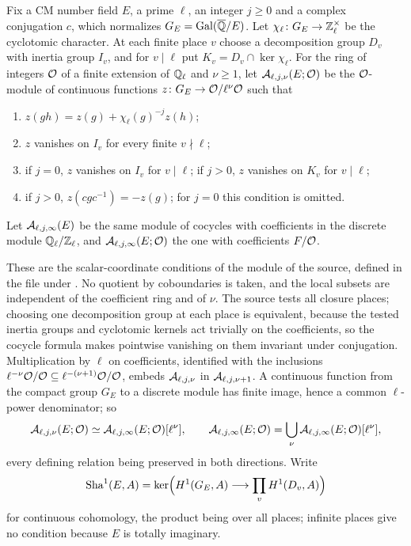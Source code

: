 \begin{definition}\label{sel:def:oddcocycles}
Fix a CM number field $E$, a prime $\ell$, an integer $j\ge0$ and a complex
conjugation $c$, which normalizes $G_E=\operatorname{Gal}(\overline{\mathbb{Q}}/E)$. Let
$\chi_\ell\colon G_E\to\mathbb{Z}_\ell^\times$ be the cyclotomic character. At each
finite place $v$ choose a decomposition group $D_v$ with inertia group
$I_v$, and for $v\mid\ell$ put $K_v=D_v\cap\ker\chi_\ell$. For the ring of
integers $\mathcal{O}$ of a finite extension of $\mathbb{Q}_\ell$ and $\nu\ge1$, let
$\mathcal{A}_{\ell,j,\nu}(E;\mathcal{O})$ be the $\mathcal{O}$-module of continuous functions
$z\colon G_E\to\mathcal{O}/\ell^\nu\mathcal{O}$ such that
\begin{enumerate}[label=\textup{(\arabic*)}]
\item $z(gh)=z(g)+\chi_\ell(g)^{-j}z(h)$;
\item $z$ vanishes on $I_v$ for every finite $v\nmid\ell$;
\item if $j=0$, $z$ vanishes on $I_v$ for $v\mid\ell$; if $j>0$, $z$
vanishes on $K_v$ for $v\mid\ell$;
\item if $j>0$, $z(cgc^{-1})=-z(g)$; for $j=0$ this condition is omitted.
\end{enumerate}
Let $\mathcal{A}_{\ell,j,\infty}(E)$ be the same module of cocycles with
coefficients in the discrete module $\mathbb{Q}_\ell/\mathbb{Z}_\ell$, and
$\mathcal{A}_{\ell,j,\infty}(E;\mathcal{O})$ the one with coefficients $F/\mathcal{O}$.
\end{definition}

These are the scalar-coordinate conditions of the module
 of the source, defined in the file
 under . No quotient by coboundaries is taken, and the local subsets are independent
of the coefficient ring and of $\nu$. The source tests all closure places;
choosing one decomposition group at each place is equivalent, because the
tested inertia groups and cyclotomic kernels act trivially on the
coefficients, so the cocycle formula makes pointwise vanishing on them
invariant under conjugation. Multiplication by $\ell$ on coefficients,
identified with the inclusions
$\ell^{-\nu}\mathcal{O}/\mathcal{O}\subseteq\ell^{-(\nu+1)}\mathcal{O}/\mathcal{O}$, embeds
$\mathcal{A}_{\ell,j,\nu}$ in $\mathcal{A}_{\ell,j,\nu+1}$. A continuous function from
the compact group $G_E$ to a discrete module has finite image, hence a
common $\ell$-power denominator; so
\begin{equation}\label{sel:eq:torsionlevels}
 \mathcal{A}_{\ell,j,\nu}(E;\mathcal{O})\simeq\mathcal{A}_{\ell,j,\infty}(E;\mathcal{O})[\ell^\nu],
 \qquad
 \mathcal{A}_{\ell,j,\infty}(E;\mathcal{O})=\bigcup_{\nu}\mathcal{A}_{\ell,j,\infty}(E;\mathcal{O})[\ell^\nu],
\end{equation}
every defining relation being preserved in both directions. Write
\[
 \operatorname{Sha}^1(E,A)=\ker\Bigl(H^1(G_E,A)\longrightarrow\prod_vH^1(D_v,A)\Bigr)
\]
for continuous cohomology, the product being over all places; infinite
places give no condition because $E$ is totally imaginary.

